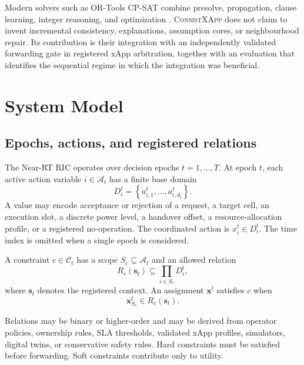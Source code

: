 \documentclass[pdflatex,sn-mathphys-num,iicol,oneside]{sn-jnl}
\newcommand{\method}{\textsc{ConsistXApp}\xspace}
\newcommand{\cpsat}{\textsc{CP-SAT}\xspace}
\begin{document}
Modern solvers such as OR-Tools \cpsat combine presolve, propagation,
clause learning, integer reasoning, and optimization
\cite{perron2023cpsat,ortools}. \method does not claim to invent
incremental consistency, explanations, assumption cores, or
neighbourhood repair. Its contribution is their integration with an
independently validated forwarding gate in registered xApp
arbitration, together with an evaluation that identifies the
sequential regime in which the integration was beneficial.

\section{System Model}
\label{sec:model}

\subsection{Epochs, actions, and registered relations}

The Near-RT RIC operates over decision epochs
$t=1,\ldots,T$. At epoch $t$, each active action variable
$i\in\mathcal{A}_t$ has a finite base domain
\begin{equation}
D_i^t=
\left\{
a_{i,1}^t,\ldots,a_{i,d_i}^t
\right\}.
\end{equation}
A value may encode acceptance or rejection of a request, a target
cell, an execution slot, a discrete power level, a handover offset, a
resource-allocation profile, or a registered no-operation. The
coordinated action is $x_i^t\in D_i^t$. The time index is omitted when
a single epoch is considered.

A constraint $c\in\mathcal{C}_t$ has a scope
$S_c\subseteq\mathcal{A}_t$ and an allowed relation
\begin{equation}
R_c(\bm{s}_t)
\subseteq
\prod_{i\in S_c}D_i^t,
\label{eq:relation}
\end{equation}
where $\bm{s}_t$ denotes the registered context. An assignment
$\bm{x}^t$ satisfies $c$ when
\begin{equation}
\bm{x}_{S_c}^t\in R_c(\bm{s}_t).
\end{equation}

Relations may be binary or higher-order and may be derived from
operator policies, ownership rules, SLA thresholds, validated xApp
profiles, simulators, digital twins, or conservative safety rules.
Hard constraints must be satisfied before forwarding. Soft
constraints contribute only to utility.
\end{document}
